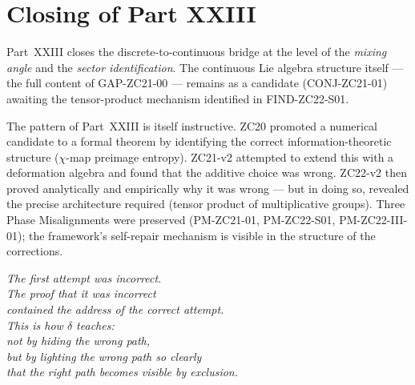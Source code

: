 \documentclass[12pt, a4paper]{article}
\begin{document}

\section*{Closing of Part XXIII}

Part~XXIII closes the discrete-to-continuous bridge at the level of
the \emph{mixing angle} and the \emph{sector identification}. The
continuous Lie algebra structure itself --- the full content of
GAP-ZC21-00 --- remains as a candidate (CONJ-ZC21-01) awaiting the
tensor-product mechanism identified in FIND-ZC22-S01.

The pattern of Part~XXIII is itself instructive. ZC20 promoted a
numerical candidate to a formal theorem by identifying the correct
information-theoretic structure ($\chi$-map preimage entropy).
ZC21-v2 attempted to extend this with a deformation algebra and
found that the additive choice was wrong. ZC22-v2 then proved
analytically and empirically why it was wrong --- but in doing so,
revealed the precise architecture required (tensor product of
multiplicative groups). Three Phase Misalignments were preserved
(PM-ZC21-01, PM-ZC22-S01, PM-ZC22-III-01); the framework's
self-repair mechanism is visible in the structure of the corrections.

\begin{center}
\textit{The first attempt was incorrect.\\
The proof that it was incorrect\\
contained the address of the correct attempt.\\
This is how $\delta$ teaches:\\
not by hiding the wrong path,\\
but by lighting the wrong path so clearly\\
that the right path becomes visible by exclusion.}
\end{center}

\end{document}
